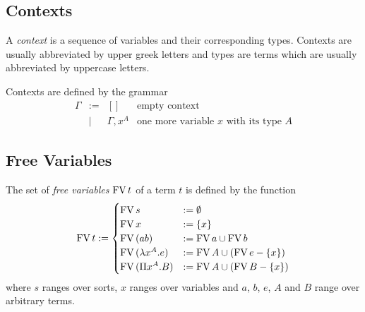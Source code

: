 \subsection{Contexts}


\begin{definition}
    A \emph{context} is a sequence of variables and their corresponding types.
    Contexts are usually abbreviated by upper greek letters and types are terms
    which are usually abbreviated by uppercase letters.

    Contexts are defined by the grammar
    $$
    \begin{array}{llll}
        \Gamma
        &:=& [] & \text{empty context}

        \\

        &\mid& \Gamma, x^A & \text{one more variable $x$ with its type $A$}
    \end{array}
    $$
\end{definition}







\subsection{Free Variables}

\begin{definition}
    The set of \emph{free variables} $\FV t$ of a term $t$ is defined by the function
    $$
    \FV t :=
        \begin{cases}
            \FV s &:= \emptyset

            \\

            \FV x &:= \{ x \}

            \\

            \FV (a b) &:= \FV a \cup \FV b

            \\

            \FV (\lambda x^A. e) &:= \FV A \cup (\FV e - \{x\})

            \\

            \FV (\Pi x^A. B) &:= \FV A \cup (\FV B - \{x\})
        \end{cases}
    $$
    where $s$ ranges over sorts, $x$ ranges over variables and $a$, $b$,
    $e$, $A$ and $B$ range over arbitrary terms.
\end{definition}


